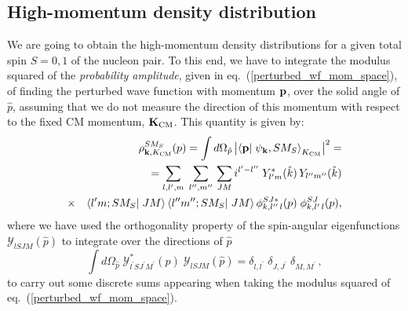 \documentclass[aps,twocolumn,showpacs,preprintnumbers,amsmath,amssymb,nofootinbib,superscriptaddress,showkeys,noeprint]{revtex4-1}
\newcommand{\nk}{{\bf k}}
\newcommand{\np}{{\bf p}}
\newcommand{\nK}{{\bf K}}
\begin{document}
\subsection{High-momentum density distribution}\label{subsec:high_mom_dens_dist}
We are going to obtain the high-momentum density distributions for a
given total spin $S=0,1$ of the nucleon pair.  To this end, we have to
integrate the modulus squared of the \emph{probability amplitude},
given in eq.~(\ref{perturbed_wf_mom_space}), of finding the perturbed
wave function with momentum $\np$, over the solid angle of $\hat{p}$,
assuming that we do not measure the direction of this momentum with
respect to the fixed CM momentum, $\nK_{\rm CM}$.  This quantity is
given by:
\begin{eqnarray}
&&\rho^{SM_S}_{\nk,K_{\rm CM}}(p)=\int d\Omega_{\hat{p}}
\left| \left\langle \np\right|\left. \psi_{\nk},SM_S\right\rangle_{K_{\rm CM}}
\right|^2=\nonumber\\
&&=\sum_{l,l^\prime,m}\;\sum_{l^{\prime\prime},m^{\prime\prime}}\,\sum_{JM}
i^{l^\prime-l^{\prime\prime}}\;
Y^*_{l^\prime m}(\hat{k})\, 
Y_{l^{\prime\prime} m^{\prime\prime}}(\hat{k})\nonumber\\
&\times&\left\langle l^\prime m;SM_S\right|\left.JM\right\rangle
\left\langle l^{\prime\prime} m^{\prime\prime};SM_S\right|\left.J M\right\rangle
\phi^{SJ *}_{k, l^{\prime\prime}\,l}(p)\;\phi^{SJ}_{k,l^\prime\,l}(p),
\label{high_dens_mom_dist_SM_S}\nonumber\\
\end{eqnarray}
where we have used the orthogonality property of the spin-angular
eigenfunctions $\mathcal{Y}_{l S J M}(\hat{p})$ to integrate over the
directions of $\hat{p}$
\begin{equation}\label{orthogonality_spin_angular}
\int d\Omega_{\hat{p}}\; 
\mathcal{Y}^*_{l^\prime S J^\prime M^\prime}(\hat{p})\;
\mathcal{Y}_{l S J M}(\hat{p})=\delta_{l, l^\prime}\;
\delta_{J, J^\prime}\; \delta_{M, M^\prime}\,,
\end{equation}
to carry out some discrete sums appearing when taking the modulus
squared of eq.~(\ref{perturbed_wf_mom_space}).
\end{document}
